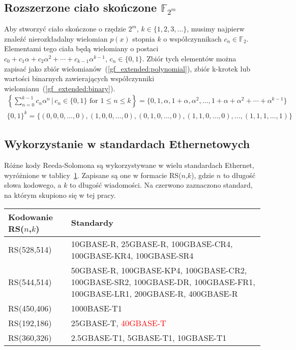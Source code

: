 \subsection{Rozszerzone ciało skończone $\mathbb{F}_{2^m}$}

Aby stworzyć ciało skończone o rzędzie $2^m$, $k \in \{ 1, 2, 3, \ldots \}$, musimy
najpierw znaleźć nierozkładalny wielomian $p(x)$ stopnia $k$ o współczynnikach
$c_{n} \in \mathbb{F}_{2}$.
Elementami tego ciała będą wielomiany o postaci $c_{0} + c_{1}\alpha + c_{2}\alpha^{2} +
    \cdots + c_{k-1}\alpha^{k-1}$, $c_{n} \in \{0, 1\}$.
Zbiór tych elementów można zapisać jako zbiór wielomianów~(\ref{gf_extended:polynomial}),
zbiór k-krotek lub wartości binarnych zawierających współczynniki
wielomianu~(\ref{gf_extended:binary}).
\begin{align}
    \left\{ \sum_{n=0}^{k-1} c_{n}\alpha^{n} \,|\, c_{n} \in \{0,1\} \text{ for } 1 \le n \le k \right\}
        = \{ 0, 1, \alpha, 1 + \alpha, \alpha^{2}, \ldots, 1 + \alpha + \alpha^2 + \cdots + \alpha^{k-1} \}
        \label{gf_extended:polynomial} \\
    \{ 0, 1 \}^{k} = \{ (0, 0, 0, \ldots, 0), (1, 0, 0, \ldots, 0), (0, 1, 0, \ldots, 0),
    (1, 1, 0, \ldots, 0), \ldots, (1, 1, 1, \ldots, 1) \} \label{gf_extended:binary}
\end{align}

\subsection{Wykorzystanie w standardach Ethernetowych}

Różne kody Reeda-Solomona są wykorzystywane w wielu standardach Ethernet,
wyróżnione w tablicy~\ref{standards:title}. Zapisane są one w formacie RS($n$,$k$),
gdzie $n$ to długość słowa kodowego, a $k$ to długość wiadomości.
Na czerwono zaznaczono standard, na którym skupiono się w tej pracy.

\begingroup
{}
\begin{table}[h]
\label{standards:title}
\centering
    \begin{tabular}{m{3cm} m{9cm}}
    \toprule
    Kodowanie RS($n$,$k$)    & Standardy \\
    \midrule
    RS(528,514)     & 10GBASE-R, 25GBASE-R, 100GBASE-CR4, 100GBASE-KR4, 100GBASE-SR4 \\
    \midrule
    RS(544,514)     & 50GBASE-R, \;\; 100GBASE-KP4, 100GBASE-CR2, 100GBASE-SR2,
    \; 100GBASE-DR, 100GBASE-FR1, 100GBASE-LR1, \hfill \; 200GBASE-R, \hfill 400GBASE-R \\
    \midrule
    RS(450,406)     & 1000BASE-T1 \\
    \midrule
    RS(192,186)     & 25GBASE-T, \;\;\;\;\;\;\;\;\;\;\;\;\; \textcolor{red}{40GBASE-T} \\
    \midrule
    RS(360,326)     & 2.5GBASE-T1, \hfill 5GBASE-T1, \hfill 10GBASE-T1 \\
    \bottomrule
    \end{tabular}
\end{table}
\endgroup

